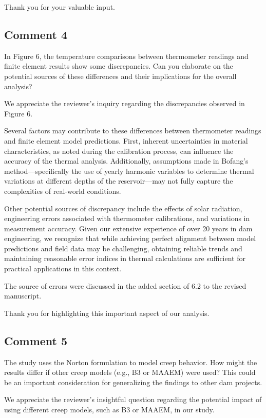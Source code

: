 \documentclass{ar2rc}
\begin{document}
	Thank you for your valuable input.
	
	   
	\subsection{Comment 4}
	\RC In Figure 6, the temperature comparisons between thermometer readings and finite element results show some discrepancies. Can you elaborate on the potential sources of these differences and their implications for the overall
	analysis?
	
	\AR	We appreciate the reviewer’s inquiry regarding the discrepancies observed in Figure 6.
	
	Several factors may contribute to these differences between thermometer readings and finite element model predictions. First, inherent uncertainties in material characteristics, as noted during the calibration process, can influence the accuracy of the thermal analysis. Additionally, assumptions made in Bofang's method—specifically the use of yearly harmonic variables to determine thermal variations at different depths of the reservoir—may not fully capture the complexities of real-world conditions.
	
	Other potential sources of discrepancy include the effects of solar radiation, engineering errors associated with thermometer calibrations, and variations in measurement accuracy. Given our extensive experience of over 20 years in dam engineering, we recognize that while achieving perfect alignment between model predictions and field data may be challenging, obtaining reliable trends and maintaining reasonable error indices in thermal calculations are sufficient for practical applications in this context.
	
	The source of errors were discussed in the added section of 6.2 to the revised manuscript.
	
	Thank you for highlighting this important aspect of our analysis.    
		
	\subsection{Comment 5}
	\RC The study uses the Norton formulation to model creep behavior. How might the results differ if other creep models (e.g., B3 or MAAEM) were used? This could be an important consideration for generalizing the findings to other dam
	projects.
	
	\AR We appreciate the reviewer’s insightful question regarding the potential impact of using different creep models, such as B3 or MAAEM, in our study.
\end{document}
